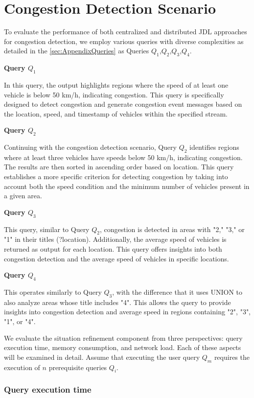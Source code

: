 \documentclass[5p,times]{elsarticle}
\begin{document}
\section*{Congestion Detection Scenario}

To evaluate the performance of both centralized and distributed JDL approaches for congestion detection,
 we employ various queries with diverse complexities as detailed in the \ref{sec:AppendixQueries} 
 as Queries \(Q_1\),\(Q_2\),\(Q_3\),\(Q_4\).

\textbf{Query \(Q_1\)}

In this query, the output highlights regions where the speed of at least one vehicle is below 50 km/h, indicating congestion. This query is specifically designed to detect congestion and generate congestion event messages based on the location, speed, and timestamp of vehicles within the specified stream.

\textbf{Query \(Q_2\)}

Continuing with the congestion detection scenario, Query \(Q_2\) identifies regions where at least three vehicles have speeds below 50 km/h, indicating congestion. The results are then sorted in ascending order based on location. This query establishes a more specific criterion for detecting congestion by taking into account both the speed condition and the minimum number of vehicles present in a given area.

\textbf{Query \(Q_3\)}

This query, similar to Query \(Q_2\), congestion is detected in areas with "2," "3," or "1" in their titles (?location). Additionally, the average speed of vehicles is returned as output for each location. This query offers insights into both congestion detection and the average speed of vehicles in specific locations.

\textbf{Query \(Q_4\)}

This operates similarly to Query \(Q_3\), with the difference that it uses UNION to also analyze areas whose title includes "4". This allows the query to provide insights into congestion detection and average speed in regions containing "2", "3", "1", or "4".


We evaluate the situation refinement component from three perspectives: query execution time, memory consumption,
 and network load. Each of these aspects will be examined in detail. Assume that executing the user query \(Q_m\) requires the execution of \(n\) prerequisite queries \(Q_i\).

\subsubsection{Query execution time}
\end{document}
